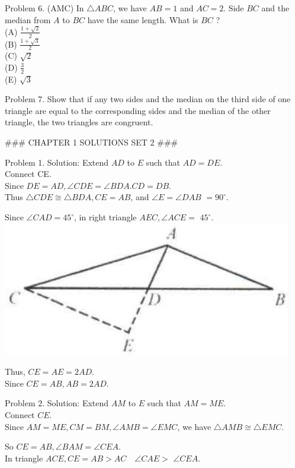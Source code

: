 \documentclass[10pt]{article}
\begin{document}
Problem 6. (AMC) In \(\triangle A B C\), we have \(A B=1\) and \(A C=2\). Side \(B C\) and the median from \(A\) to \(B C\) have the same length. What is \(B C\) ?\\
(A) \(\frac{1+\sqrt{2}}{2}\)\\
(B) \(\frac{1+\sqrt{3}}{2}\)\\
(C) \(\sqrt{2}\)\\
(D) \(\frac{3}{2}\)\\
(E) \(\sqrt{3}\)

Problem 7. Show that if any two sides and the median on the third side of one triangle are equal to the corresponding sides and the median of the other triangle, the two triangles are congruent.


### CHAPTER 1 SOLUTIONS SET 2 ###

Problem 1. Solution:
Extend \(A D\) to \(E\) such that \(A D=D E\).\\
Connect CE.\\
Since \(D E=A D, \angle C D E=\angle B D A . C D=D B\).\\
Thus \(\triangle C D E \cong \triangle B D A, C E=A B\), and \(\angle E=\angle D A B\) \(=90^{\circ}\).

Since \(\angle C A D=45^{\circ}\), in right triangle \(A E C, \angle A C E=\) \(45^{\circ}\).\\
\includegraphics[max width=\textwidth, center]{2025_04_17_97bc1f7e44d93c271a88g-029}

Thus, \(C E=A E=2 A D\).\\
Since \(C E=A B, A B=2 A D\).

Problem 2. Solution:
Extend \(A M\) to \(E\) such that \(A M=M E\).\\
Connect \(C E\).\\
Since \(A M=M E, C M=B M, \angle A M B=\angle E M C\), we have \(\triangle A M B \cong \triangle E M C\).

So \(C E=A B, \angle B A M=\angle C E A\).\\
In triangle \(A C E, C E=A B>A C \quad \angle C A E>\) \(\angle C E A\).
\end{document}

